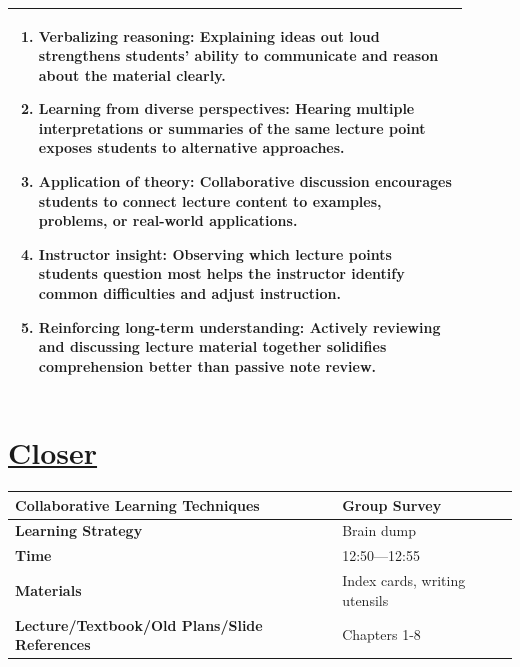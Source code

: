 \documentclass{article}
\begin{document}
{{\begin{tabular}{|p{0.9\linewidth}|}
\begin{enumerate}
    \item \textbf{Verbalizing reasoning:} Explaining ideas out loud strengthens students’ ability to communicate and reason about the material clearly.
    \item \textbf{Learning from diverse perspectives:} Hearing multiple interpretations or summaries of the same lecture point exposes students to alternative approaches.
    \item \textbf{Application of theory:} Collaborative discussion encourages students to connect lecture content to examples, problems, or real-world applications.
    \item \textbf{Instructor insight:} Observing which lecture points students question most helps the instructor identify common difficulties and adjust instruction.
    \item \textbf{Reinforcing long-term understanding:} Actively reviewing and discussing lecture material together solidifies comprehension better than passive note review.
\end{enumerate} \\
\hline  
\end{tabular}

\newpage
\noindent
\section*{\underline{Closer}}
\begin{tabular}{|p{4.2cm}|p{9.8cm}|}
\hline
\textbf{Collaborative Learning Techniques} & Group Survey\\
\hline
\textbf{Learning Strategy} & Brain dump\\
\hline
\textbf{Time} & 12:50---12:55\\
\hline
\textbf{Materials} & Index cards, writing utensils\\
\hline
\textbf{Lecture/Textbook/Old Plans/Slide References} & Chapters 1-8 \\
\hline
\end{tabular}

}}
\end{document}
